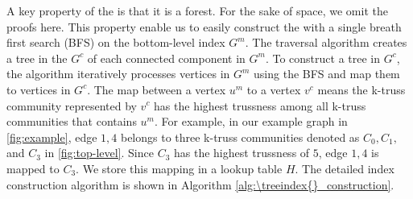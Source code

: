 A key property of the \treeindex{} is that it is a forest. For the sake of space, we omit the proofs here. This property enable us to easily construct the \treeindex{} with a single breath first search (BFS) on the bottom-level index $G^m$. The traversal algorithm creates a tree in the \treeindex{} $G^c$ of each connected component in $G^m$. To construct a tree in $G^c$, the algorithm iteratively processes vertices in $G^m$ using the BFS and map them to vertices in $G^c$. 
The map between a vertex $u^m$ to a vertex $v^c$ means the k-truss community represented by $v^c$ has the highest trussness among all k-truss communities that contains $u^m$. For example, in our example graph in \autoref{fig:example}, edge $1,4$ belongs to three k-truss communities denoted as $C_{0}, C_{1},$ and $C_{3}$ in \autoref{fig:top-level}. Since $C_{3}$ has the highest trussness of $5$, edge $1,4$ is mapped to $C_{3}$. We store this mapping in a lookup table $H$. The detailed index construction algorithm is shown in Algorithm \ref{alg:\treeindex{}_construction}. 





